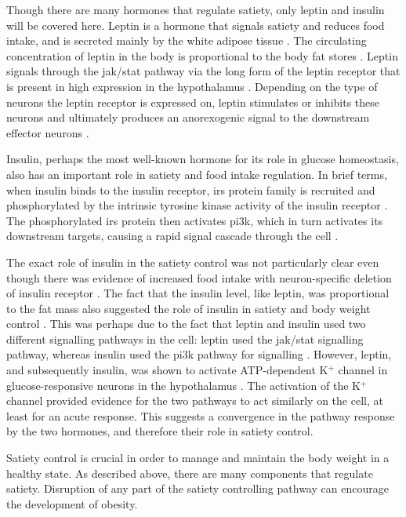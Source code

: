 Though there are many hormones that regulate satiety, only leptin and insulin will be covered here.
Leptin is a hormone that signals satiety and reduces food intake, and is secreted mainly by the white adipose tissue \citep{Moustafa2013,Zhang1994}.
The circulating concentration of leptin in the body is proportional to the body fat stores \citep{Barsh2002, Moustafa2013}.
Leptin signals through the \gls{jak}/\gls{stat} pathway via the long form of the leptin receptor that is present in high expression in the hypothalamus \citep{Ghilardi1996,Lee1996}.
Depending on the type of neurons the leptin receptor is expressed on, leptin stimulates or inhibits these neurons and ultimately produces an anorexogenic signal to the downstream effector neurons \citep{Bell2005}.

Insulin, perhaps the most well-known hormone for its role in glucose homeostasis, also has an important role in satiety and food intake regulation.
In brief terms, when insulin binds to the insulin receptor, \gls{irs} protein family is recruited and phosphorylated by the  intrinsic tyrosine kinase activity of the insulin receptor \citep{Saltiel2002}.
The phosphorylated \gls{irs} protein then activates \gls{pi3k}, which in turn activates its downstream targets, causing a rapid signal cascade through the cell \citep{Saltiel2002}.

The exact role of insulin in the satiety control was not particularly clear even though there was evidence of increased food intake with neuron-specific deletion of insulin receptor \citep{Barsh2002,Bruning2000}.
The fact that the insulin level, like leptin, was proportional to the fat mass also suggested the role of insulin in satiety and body weight control \citep{Barsh2002, Bruning2000, Woods1979}.
This was perhaps due to the fact that leptin and insulin used two different signalling pathways in the cell: leptin used the \gls{jak}/\gls{stat} signalling pathway, whereas insulin used the \gls{pi3k} pathway for signalling \citep{Ghilardi1996}.
However, leptin, and subsequently insulin, was shown to activate ATP-dep\-endent K$^+$ channel in glucose-responsive neurons in the hypothalamus \citep{Spanswick1997, Spanswick2000}.
The activation of the K$^+$ channel provided evidence for the two pathways to act similarly on the cell, at least for an acute response.
This suggests a convergence in the pathway response by the two hormones, and therefore their role in satiety control.

Satiety control is crucial in order to manage  and maintain the body weight in a healthy state.
As described above, there are many components that regulate satiety.
Disruption of any part of the satiety controlling pathway can encourage the development of obesity.

